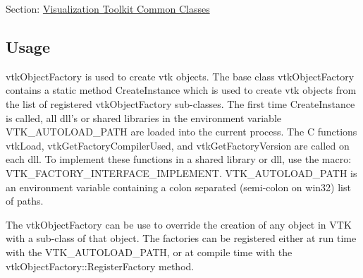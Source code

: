 Section\-: \hyperlink{sec_vtkcommon}{Visualization Toolkit Common Classes} \hypertarget{vtkwidgets_vtkxyplotwidget_Usage}{}\subsection{Usage}\label{vtkwidgets_vtkxyplotwidget_Usage}
vtk\-Object\-Factory is used to create vtk objects. The base class vtk\-Object\-Factory contains a static method Create\-Instance which is used to create vtk objects from the list of registered vtk\-Object\-Factory sub-\/classes. The first time Create\-Instance is called, all dll's or shared libraries in the environment variable V\-T\-K\-\_\-\-A\-U\-T\-O\-L\-O\-A\-D\-\_\-\-P\-A\-T\-H are loaded into the current process. The C functions vtk\-Load, vtk\-Get\-Factory\-Compiler\-Used, and vtk\-Get\-Factory\-Version are called on each dll. To implement these functions in a shared library or dll, use the macro\-: V\-T\-K\-\_\-\-F\-A\-C\-T\-O\-R\-Y\-\_\-\-I\-N\-T\-E\-R\-F\-A\-C\-E\-\_\-\-I\-M\-P\-L\-E\-M\-E\-N\-T. V\-T\-K\-\_\-\-A\-U\-T\-O\-L\-O\-A\-D\-\_\-\-P\-A\-T\-H is an environment variable containing a colon separated (semi-\/colon on win32) list of paths.

The vtk\-Object\-Factory can be use to override the creation of any object in V\-T\-K with a sub-\/class of that object. The factories can be registered either at run time with the V\-T\-K\-\_\-\-A\-U\-T\-O\-L\-O\-A\-D\-\_\-\-P\-A\-T\-H, or at compile time with the vtk\-Object\-Factory\-::\-Register\-Factory method.


